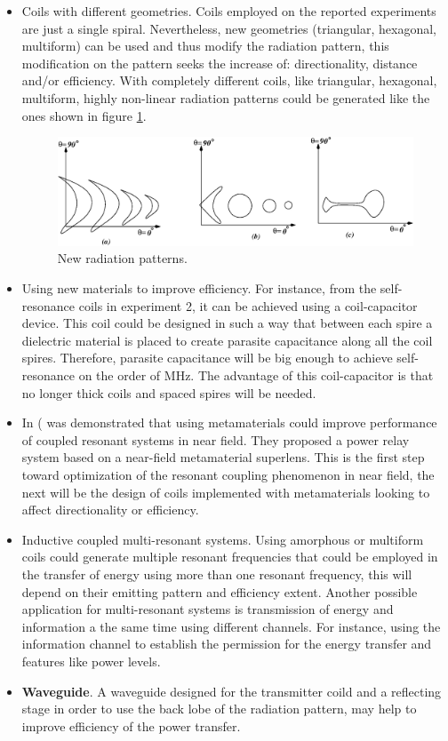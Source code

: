 \documentclass{intech}
\begin{document}
\begin{itemize}
\item Coils with different geometries. Coils employed on the reported experiments are just a single spiral.  Nevertheless, new geometries (triangular, hexagonal, multiform) can be used and thus modify the radiation pattern, this modification on the pattern seeks the increase of: directionality, distance and/or efficiency. With completely different coils, like triangular, hexagonal, multiform, highly non-linear radiation patterns could be generated like the ones shown in figure \ref{patronloco}.
\begin{figure}[hbtp]
\centering
\includegraphics[width=12cm]{img/patrones.eps}
\caption{New radiation patterns.}
\label{patronloco}
\end{figure}



\item Using new materials to improve efficiency. For instance, from the self-resonance coils in experiment 2, it can be achieved using a coil-capacitor device. This coil could be designed in such a way that between each spire a dielectric material is placed to create parasite capacitance along all the coil spires. Therefore, parasite capacitance will be big enough to achieve self-resonance on the order of MHz. The advantage of this coil-capacitor is that no longer thick coils and spaced spires will be needed.
\item In (\cite{meta} was demonstrated that using metamaterials could improve performance of coupled resonant systems in near field. They proposed a power relay system based on a near-field metamaterial superlens. This is the first step toward optimization of the resonant coupling phenomenon in near field, the next will be the design of coils implemented with metamaterials looking to affect directionality or efficiency.
\item Inductive coupled multi-resonant systems. Using amorphous or multiform coils could generate multiple resonant frequencies that could be employed in the transfer of energy using more than one resonant frequency, this will depend on their emitting pattern and efficiency extent. Another possible application for multi-resonant systems is transmission of energy and information a the same time using different channels. For instance, using the information channel to establish the permission for the energy transfer and features like power levels.
\item {\bf Waveguide}. A waveguide designed for the transmitter coild and a reflecting stage in order to use the back lobe of the radiation pattern, may help to improve efficiency of the power transfer.
\end{itemize}




\end{document}
